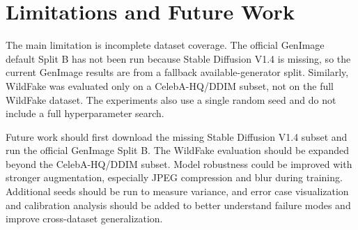 \documentclass[11pt]{article}
\begin{document}
\section{Limitations and Future Work}

The main limitation is incomplete dataset coverage. The official GenImage default Split B has not been run because Stable Diffusion V1.4 is missing, so the current GenImage results are from a fallback available-generator split. Similarly, WildFake was evaluated only on a CelebA-HQ/DDIM subset, not on the full WildFake dataset. The experiments also use a single random seed and do not include a full hyperparameter search.

Future work should first download the missing Stable Diffusion V1.4 subset and run the official GenImage Split B. The WildFake evaluation should be expanded beyond the CelebA-HQ/DDIM subset. Model robustness could be improved with stronger augmentation, especially JPEG compression and blur during training. Additional seeds should be run to measure variance, and error case visualization and calibration analysis should be added to better understand failure modes and improve cross-dataset generalization.
\end{document}
